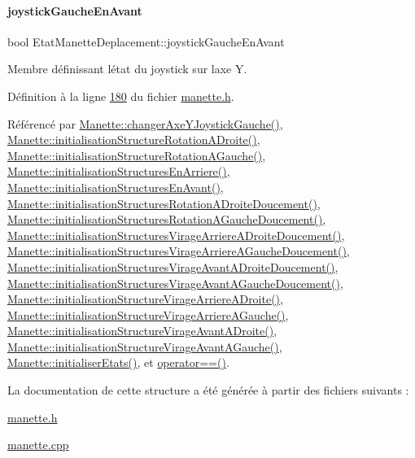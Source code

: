 \paragraph{\texorpdfstring{joystick\+Gauche\+En\+Avant}{joystickGaucheEnAvant}}
{\footnotesize\ttfamily bool Etat\+Manette\+Deplacement\+::joystick\+Gauche\+En\+Avant}



Membre définissant l\textquotesingle{}état du joystick sur l\textquotesingle{}axe Y. 



Définition à la ligne \hyperlink{manette_8h_source_l00180}{180} du fichier \hyperlink{manette_8h_source}{manette.\+h}.



Référencé par \hyperlink{manette_8cpp_source_l00438}{Manette\+::changer\+Axe\+Y\+Joystick\+Gauche()}, \hyperlink{manette_8cpp_source_l00178}{Manette\+::initialisation\+Structure\+Rotation\+A\+Droite()}, \hyperlink{manette_8cpp_source_l00151}{Manette\+::initialisation\+Structure\+Rotation\+A\+Gauche()}, \hyperlink{manette_8cpp_source_l00127}{Manette\+::initialisation\+Structures\+En\+Arriere()}, \hyperlink{manette_8cpp_source_l00103}{Manette\+::initialisation\+Structures\+En\+Avant()}, \hyperlink{manette_8cpp_source_l00188}{Manette\+::initialisation\+Structures\+Rotation\+A\+Droite\+Doucement()}, \hyperlink{manette_8cpp_source_l00161}{Manette\+::initialisation\+Structures\+Rotation\+A\+Gauche\+Doucement()}, \hyperlink{manette_8cpp_source_l00296}{Manette\+::initialisation\+Structures\+Virage\+Arriere\+A\+Droite\+Doucement()}, \hyperlink{manette_8cpp_source_l00269}{Manette\+::initialisation\+Structures\+Virage\+Arriere\+A\+Gauche\+Doucement()}, \hyperlink{manette_8cpp_source_l00242}{Manette\+::initialisation\+Structures\+Virage\+Avant\+A\+Droite\+Doucement()}, \hyperlink{manette_8cpp_source_l00215}{Manette\+::initialisation\+Structures\+Virage\+Avant\+A\+Gauche\+Doucement()}, \hyperlink{manette_8cpp_source_l00286}{Manette\+::initialisation\+Structure\+Virage\+Arriere\+A\+Droite()}, \hyperlink{manette_8cpp_source_l00259}{Manette\+::initialisation\+Structure\+Virage\+Arriere\+A\+Gauche()}, \hyperlink{manette_8cpp_source_l00232}{Manette\+::initialisation\+Structure\+Virage\+Avant\+A\+Droite()}, \hyperlink{manette_8cpp_source_l00205}{Manette\+::initialisation\+Structure\+Virage\+Avant\+A\+Gauche()}, \hyperlink{manette_8cpp_source_l00023}{Manette\+::initialiser\+Etats()}, et \hyperlink{manette_8cpp_source_l00636}{operator==()}.



La documentation de cette structure a été générée à partir des fichiers suivants \+:\begin{DoxyCompactItemize}
\item 
\hyperlink{manette_8h}{manette.\+h}\item 
\hyperlink{manette_8cpp}{manette.\+cpp}\end{DoxyCompactItemize}
